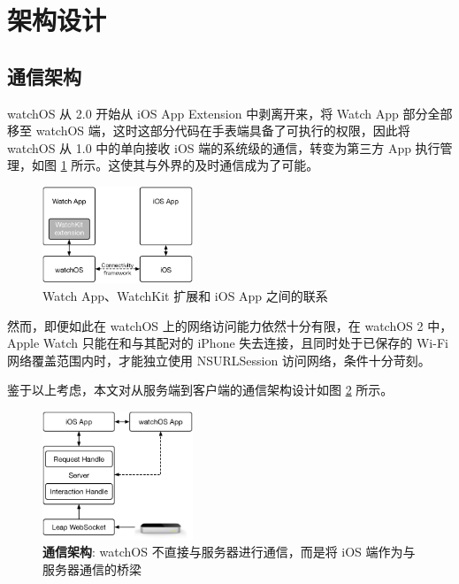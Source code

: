 \section{架构设计}
\label{sec:arch-design}

\subsection{通信架构}
\label{sub:im-arch}

watchOS 从 2.0 开始从 iOS App Extension 中剥离开来，将 Watch App 部分全部移至 watchOS 端，这时这部分代码在手表端具备了可执行的权限，因此将 watchOS 从 1.0 中的单向接收 iOS 端的系统级的通信，转变为第三方 App 执行管理\cite{WatchGuide:2016}，如图 \ref{fig:watch-phone} 所示。这使其与外界的及时通信成为了可能。

\begin{figure}[H]
    \centering
    \includegraphics[width=0.4\textwidth]{figures/watch-phone}
    \caption{\kaishu Watch App、WatchKit 扩展和 iOS App 之间的联系}
    \label{fig:watch-phone}
\end{figure}

然而，即便如此在 watchOS 上的网络访问能力依然十分有限，在 watchOS 2 中，Apple Watch 只能在和与其配对的 iPhone 失去连接，且同时处于已保存的 Wi-Fi 网络覆盖范围内时，才能独立使用 NSURLSession 访问网络，条件十分苛刻。

鉴于以上考虑，本文对从服务端到客户端的通信架构设计如图 \ref{fig:im-arch} 所示。

\begin{figure}[H]
    \centering
    \includegraphics[width=0.4\textwidth]{figures/arch}
    \caption{\kaishu \textbf{通信架构}: watchOS 不直接与服务器进行通信，而是将 iOS 端作为与服务器通信的桥梁}
    \label{fig:im-arch}
\end{figure}

